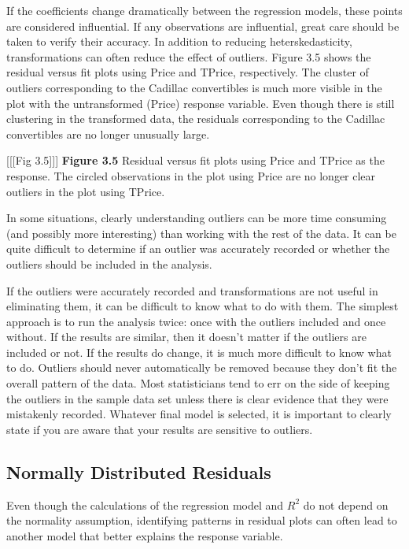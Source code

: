 \documentclass[
]{report}
\begin{document}
If the coefficients change dramatically between the regression models, these points are considered influential. If any observations are influential, great care should be taken to verify their accuracy. In addition to reducing heterskedasticity, transformations can often reduce the effect of outliers. Figure 3.5 shows the residual versus fit plots using Price and TPrice, respectively. The cluster of outliers corresponding to the Cadillac convertibles is much more visible in the plot with the untransformed (Price) response
variable. Even though there is still clustering in the transformed data, the residuals corresponding to the Cadillac convertibles are no longer unusually large.

{[}{[}{[}Fig 3.5{]}{]}{]}
\textbf{Figure 3.5} Residual versus fit plots using Price and TPrice as the response. The circled observations in the plot using Price are no longer clear outliers in the plot using TPrice.

In some situations, clearly understanding outliers can be more time consuming (and possibly more interesting) than working with the rest of the data. It can be quite difficult to determine if an outlier was accurately recorded or whether the outliers should be included in the analysis.

If the outliers were accurately recorded and transformations are not useful in eliminating them, it can be difficult to know what to do with them. The simplest approach is to run the analysis twice: once with the outliers included and once without. If the results are similar, then it doesn't matter if the outliers are included or not. If the results do change, it is much more difficult to know what to do. Outliers should never automatically be removed because they don't fit the overall pattern of the data. Most statisticians tend to err on the side of keeping the outliers in the sample data set unless there is clear evidence that they were mistakenly recorded. Whatever final model is selected, it is important to clearly state if you are aware that your results are sensitive to outliers.

\subsection*{Normally Distributed Residuals}\label{normally-distributed-residuals}

Even though the calculations of the regression model and \(R^2\) do not depend on the normality assumption, identifying patterns in residual plots can often lead to another model that better explains the response variable.
\end{document}
